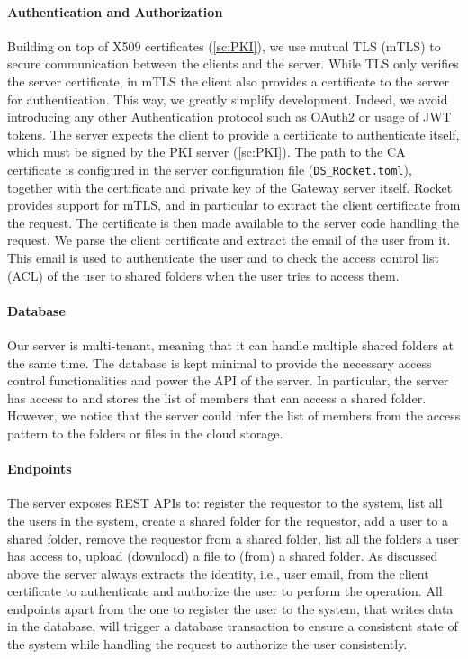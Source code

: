\paragraph{Authentication and Authorization}
Building on top of X509 certificates (\cref{sc:PKI}), we use
mutual TLS (mTLS) to 
secure communication between the clients and the server.
While TLS only verifies the server certificate,
in mTLS the client also provides a certificate to the server
for authentication.
This way, we greatly simplify development. Indeed, we 
avoid introducing any other Authentication
protocol such as OAuth2 or usage of JWT tokens. 
The server expects the client to provide a certificate
to authenticate itself, which must be signed by the
PKI server (\cref{sc:PKI}).
The path to the CA certificate is configured in the
server configuration file (\texttt{DS\_Rocket.toml}),
together with the certificate and private key of the
Gateway server itself. Rocket provides support for
mTLS, and in particular to extract the client
certificate from the request. The certificate is then
made available to the server code handling the request.
We parse the client certificate and extract the email
of the user from it. This email is used to authenticate
the user and to check the access control list (ACL)
of the user to shared folders when the user tries to
access them.

\paragraph{Database}
Our server is multi-tenant, meaning that it can handle
multiple shared folders at the same time.
The database is kept minimal to provide the necessary 
access control functionalities and power the
API of the server. In particular, the server has access to
and stores the list of members that can access a shared folder.
However, we notice that the server could infer the list of members
from the access pattern to the folders or files
in the cloud storage.


\paragraph{Endpoints}
The server exposes REST APIs to: register the requestor to the system,
list all the users in the system,
create a shared folder for the requestor,
add a user to a shared folder,
remove the requestor from a shared folder,
list all the folders a user has access to,
upload (download) a file to (from) a shared folder.
As discussed above the server always extracts the identity,
i.e., user email, from the client certificate to authenticate
and authorize the user to perform the operation.
All endpoints apart from the one to register the user
to the system, that writes data in the database,
will trigger a database transaction 
to ensure a consistent state of the system while
handling the request to authorize the
user consistently.

